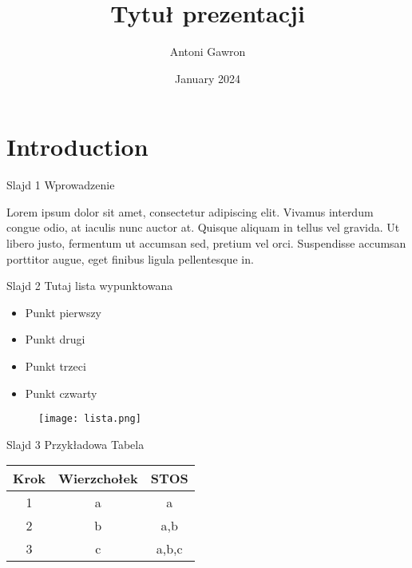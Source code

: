 \documentclass{beamer}
\title{Tytuł prezentacji}
\author{Antoni Gawron}
\date{January 2024}
\begin{document}
\maketitle

\section{Introduction}

\begin{frame}{Slajd 1}
Wprowadzenie 

\vspace{10pt}
Lorem ipsum dolor sit amet, consectetur adipiscing elit. Vivamus interdum congue odio, at iaculis nunc auctor at. Quisque aliquam in tellus vel gravida. Ut libero justo, fermentum ut accumsan sed, pretium vel orci. Suspendisse accumsan porttitor augue, eget finibus ligula pellentesque in. 

\end{frame}

\begin{frame}{Slajd 2}
Tutaj lista wypunktowana

\begin{itemize}
  \item Punkt pierwszy
  \item Punkt drugi
  \item Punkt trzeci
  \item Punkt czwarty
\end{itemize}
\begin{figure}
    \centering
    \texttt{[image: lista.png]}
    \label{fig:enter-label}
\end{figure}



\end{frame}


\begin{frame}{Slajd 3}
Przykładowa Tabela 

\begin{table}[htb]
  \centering
  \begin{tabular}{|c|c|c|}
    \hline
    Krok & Wierzchołek & STOS \\
    \hline
    1 & a & a \\
    \hline
    2 & b & a,b \\
    \hline
    3 & c & a,b,c \\
    \hline
  \end{tabular}
\end{table}

\end{frame}
\end{document}
